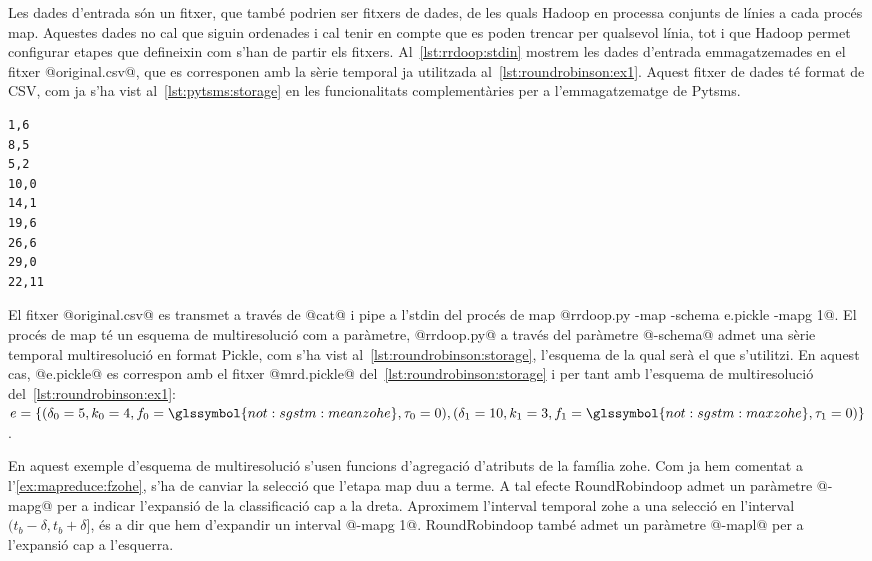 Les dades d'entrada són un fitxer, que també podrien ser fitxers de
dades, de les quals Hadoop en processa conjunts de línies a cada
procés map. Aquestes dades no cal que siguin ordenades i cal tenir en
compte que es poden trencar per qualsevol línia, tot i que Hadoop
permet configurar etapes que defineixin com s'han de partir els
fitxers.  Al~\autoref{lst:rrdoop:stdin} mostrem les dades d'entrada
emmagatzemades en el fitxer @original.csv@, que es corresponen
amb la sèrie temporal ja utilitzada
al~\autoref{lst:roundrobinson:ex1}.  Aquest fitxer de dades té format
de \gls{CSV}, com ja s'ha vist al~\autoref{lst:pytsms:storage} en les
funcionalitats complementàries per a l'emmagatzematge de Pytsms.
\begin{lstlisting}[style=file,caption=Dades d'entrada original.csv,label=lst:rrdoop:stdin]
1,6
8,5
5,2
10,0
14,1
19,6
26,6
29,0
22,11
\end{lstlisting}


El fitxer @original.csv@ es transmet a través de @cat@ i pipe a
l'stdin del procés de map %
@rrdoop.py -map -schema e.pickle -mapg 1@.  El procés de map té un esquema de
multiresolució com a paràmetre, @rrdoop.py@ a través del paràmetre
@-schema@ admet una sèrie temporal multiresolució en format Pickle,
com s'ha vist al~\autoref{lst:roundrobinson:storage}, l'esquema de la
qual serà el que s'utilitzi. En aquest cas, @e.pickle@ es correspon
amb el fitxer @mrd.pickle@ del~\autoref{lst:roundrobinson:storage} i
per tant amb l'esquema de multiresolució
del~\autoref{lst:roundrobinson:ex1}:
$e=\{(\delta_0=5,k_0=4,f_0=\glssymbol{not:sgstm:meanzohe},\tau_0=0),(\delta_1=10,k_1=3,f_1=\glssymbol{not:sgstm:maxzohe},\tau_1=0)\}$.


En aquest exemple d'esquema de multiresolució s'usen funcions
d'agregació d'atributs de la família \gls{zohe}. Com ja hem comentat a
l'\autoref{ex:mapreduce:fzohe}, s'ha de canviar la selecció que
l'etapa map duu a terme. A tal efecte RoundRobindoop admet un
paràmetre @-mapg@ per a indicar l'expansió de la classificació cap a
la dreta. Aproximem l'interval temporal \gls{zohe} a una selecció en
l'interval $(t_b-\delta,t_b+\delta]$, és a dir que hem d'expandir un
interval @-mapg 1@.  RoundRobindoop també admet un paràmetre @-mapl@
per a l'expansió cap a l'esquerra.


